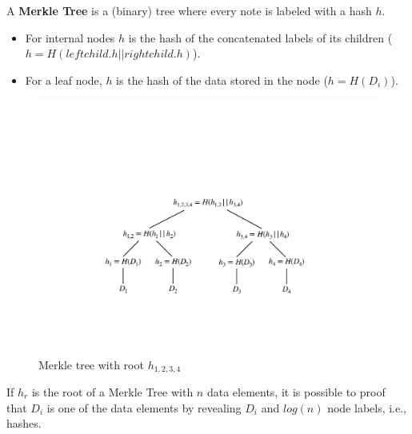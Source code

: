 \begin{definition}
	A \textbf{Merkle Tree} is a (binary) tree where every note is labeled with a hash $h$.
	\begin{itemize}
		\item For internal nodes $h$ is the hash of the concatenated labels of its children ($h=H(\mathit{leftchild}.h||\mathit{rightchild}.h)$).
		\item For a leaf node, $h$ is the hash of the data stored in the node ($h=H(D_i)$).
	\end{itemize}
\end{definition}

\begin{figure}[ht]
	\includegraphics[width=\linewidth]{fig/merkletree}
	\caption{Merkle tree with root $h_{1,2,3,4}$}
\end{figure}

\begin{lem}
If $h_r$ is the root of a Merkle Tree with $n$ data elements, it is possible to proof that $D_i$ is one of the data elements by revealing $D_i$ and $log(n)$ node labels, i.e., hashes.
\end{lem}


